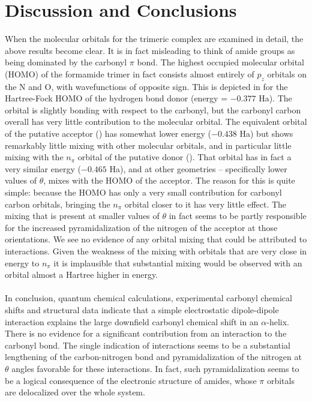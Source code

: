 \section{Discussion and Conclusions}

\begin{doublespace}
When the molecular orbitals for the trimeric complex are examined in detail, 
the above results become clear. It is in fact misleading to think of amide 
groups as being dominated by the carbonyl $\pi$ bond. The highest occupied
molecular orbital (HOMO) of the formamide trimer in fact consists almost
entirely of $p_z$ orbitals on the N and O, with wavefunctions of opposite sign.
This is depicted in  for the Hartree-Fock HOMO of
the hydrogen bond donor (energy = $-0.377$ Ha). The orbital is slightly
bonding with respect to the carbonyl, but the carbonyl carbon overall
has very little contribution to the molecular orbital. The equivalent
orbital of the putative acceptor ()
has somewhat lower energy ($-0.438$ Ha) but shows remarkably
little mixing with other molecular orbitals, and in particular little mixing
with the $n_\pi$ orbital of the putative \npipistar{} donor
().
That orbital has in fact a very similar energy ($-0.465$ Ha), and at other
geometries -- specifically lower values of $\theta$, mixes with the HOMO of
the acceptor. The reason for this is quite simple: because the HOMO has only a
very small contribution for carbonyl carbon orbitals, bringing the $n_\pi$
orbital closer to it has very little effect. The mixing that is present at
smaller values of $\theta$ in fact seems to be partly responsible for the
increased pyramidalization of the nitrogen of the acceptor at those
orientations. We see no evidence of any orbital mixing that could be attributed
to \npipistar{} interactions. Given the weakness of the mixing with orbitals
that are very close in energy to $n_\pi$ it is implausible that substantial
mixing would be observed with an orbital almost a Hartree higher in energy.
\\\\
In conclusion, quantum chemical calculations, experimental carbonyl \cnmr{}
chemical shifts and structural data indicate that a simple electrostatic
dipole-dipole interaction explains the large downfield carbonyl \cnmr{}
chemical shift in an $\alpha$-helix. There is no evidence for a significant
contribution from an \npistar{} interaction to the carbonyl bond. The single
indication of \npistar{} interactions seems to be a substantial lengthening of
the carbon-nitrogen bond and pyramidalization of the nitrogen at $\theta$
angles favorable for these interactions. In fact, such pyramidalization seems
to be a logical consequence of the electronic structure of amides, whose $\pi$
orbitals are delocalized over the whole system.
\end{doublespace}




